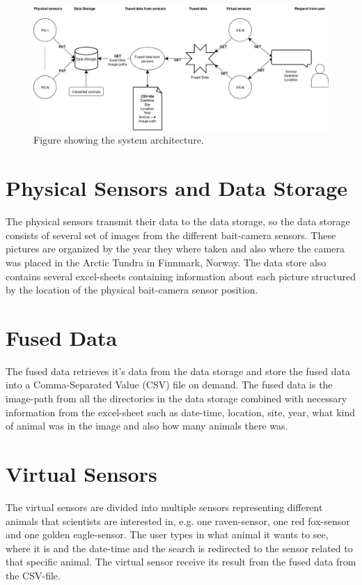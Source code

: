 \documentclass[USenglish]{uit-thesis}
\begin{document}
\begin{figure}
\centering
\includegraphics[width=\textwidth]{Architecture2.png}
\caption{Figure showing the system architecture.}
\label{fig:architecture}
\end{figure}


\section{Physical Sensors and Data Storage}
The physical sensors transmit their data to the data storage, so the data storage consists of several set of images from the different bait-camera sensors. These pictures are organized by the year they where taken and also where the camera was placed in the Arctic Tundra in Finnmark, Norway. 
The data store also contains several excel-sheets containing information about each picture structured by the location of the physical bait-camera sensor position.

\section{Fused Data}
The fused data retrieves it's data from the data storage and store the fused data into a Comma-Separated Value (CSV) file on demand. The fused data is the image-path from all the directories in the data storage combined with necessary information from the excel-sheet such as date-time, location, site, year, what kind of animal was in the image and also how many animals there was.

\section{Virtual Sensors}
The virtual sensors are divided into multiple sensors representing different animals that scientists are interested in, e.g. one raven-sensor, one red fox-sensor and one golden eagle-sensor.
The user types in what animal it wants to see, where it is and the date-time and the search is redirected to the sensor related to that specific animal. The virtual sensor receive its result from the fused data from the CSV-file.
\end{document}
